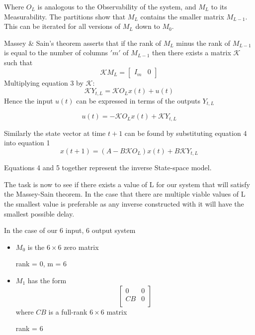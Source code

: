 \documentclass{article}
\begin{document}
Where $O_L$ is analogous to the Observability of the system, and $M_L$ to its Measurability. The partitions show that $M_L$ contains the smaller matrix $M_{L-1}$. This can be iterated for all versions of $M_L$ down to $M_0$.

Massey \& Sain's theorem asserts that if the rank of $M_L$ minus the rank of $M_{L-1}$ is equal to the number of columns $'m'$ of $M_{L-1}$ then there exists a matrix $\mathcal{K}$ such that
\[
\mathcal{K}M_L =
\left[
\begin{array}{c|c}
I_m & 0
\end{array}
\right]
\]
Multiplying equation 3 by $\mathcal{K}$:
\[
\mathcal{K}Y_{t,L} = \mathcal{K}O_Lx(t) + u(t)
\]
Hence the input $u(t)$ can be expressed in terms of the outputs $Y_{t,L}$

\begin{equation}
u(t) = -\mathcal{K}O_Lx(t) + \mathcal{K}Y_{t,L}
\end{equation}

Similarly the state vector at time $t+1$ can be found by substituting equation 4 into equation 1
\begin{equation}
x(t+1) = (A-B\mathcal{K}O_L)x(t) + B\mathcal{K}Y_{t,L}
\end{equation}

Equations 4 and 5 together represent the inverse State-space model.

The task is now to see if there exists a value of L for our system that will satisfy the Massey-Sain theorem. In the case that there are multiple viable values of L the smallest value is preferable as any inverse constructed with it will have the smallest possible delay.

In the case of our 6 input, 6 output system
\begin{itemize}
\item{$M_0$ is the $6\times6$ zero matrix
\begin{flushright}
rank = 0, m = 6
\end{flushright}
}
\item{$M_1$ has the form
\[
\left[
\begin{array}{cc}
0	&	0	\\
CB	&	0	\\
\end{array}
\right]
\]
where $CB$ is a full-rank $6\times6$ matrix
\begin{flushright}
rank = 6
\end{flushright}
}
\end{itemize}
\end{document}
